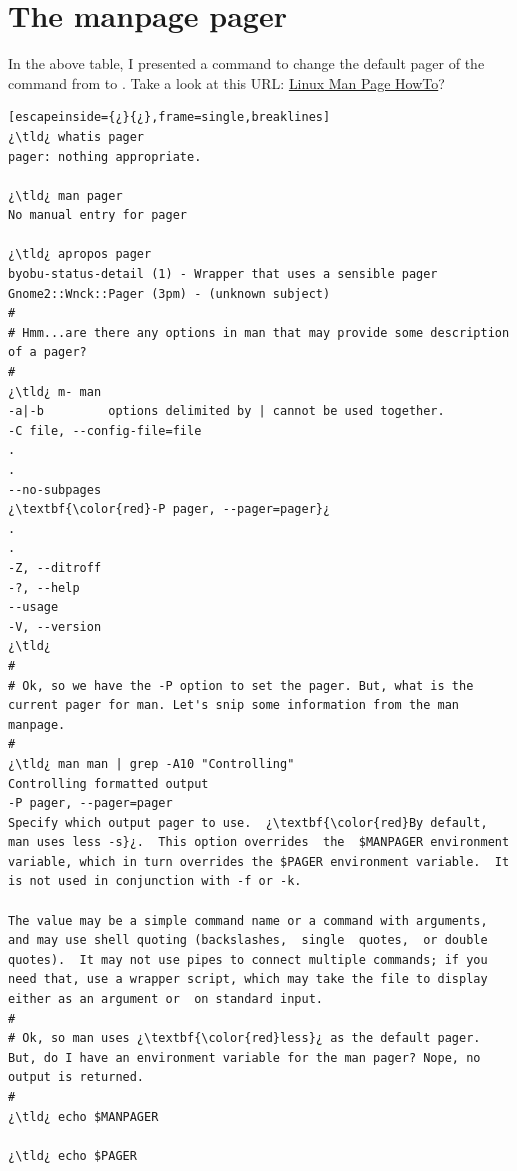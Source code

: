 \section{The manpage pager}

In the above table, I presented a command to change the default pager of the  command from  to . Take a look at this URL: \href{http://www.tldp.org/HOWTO/Man-Page/index.html}{Linux Man Page HowTo}?

\begin{lstlisting}[escapeinside={¿}{¿},frame=single,breaklines]
¿\tld¿ whatis pager
pager: nothing appropriate.

¿\tld¿ man pager
No manual entry for pager

¿\tld¿ apropos pager
byobu-status-detail (1) - Wrapper that uses a sensible pager
Gnome2::Wnck::Pager (3pm) - (unknown subject)
#
# Hmm...are there any options in man that may provide some description of a pager?
#
¿\tld¿ m- man
-a|-b		  options delimited by | cannot be used together.
-C file, --config-file=file
.
.
--no-subpages
¿\textbf{\color{red}-P pager, --pager=pager}¿
.
.
-Z, --ditroff
-?, --help
--usage
-V, --version
¿\tld¿ 
#
# Ok, so we have the -P option to set the pager. But, what is the current pager for man. Let's snip some information from the man manpage.
#
¿\tld¿ man man | grep -A10 "Controlling"
Controlling formatted output
-P pager, --pager=pager
Specify which output pager to use.  ¿\textbf{\color{red}By default, man uses less -s}¿.  This option overrides  the  $MANPAGER environment variable, which in turn overrides the $PAGER environment variable.  It is not used in conjunction with -f or -k.

The value may be a simple command name or a command with arguments, and may use shell quoting (backslashes,  single  quotes,  or double quotes).  It may not use pipes to connect multiple commands; if you need that, use a wrapper script, which may take the file to display either as an argument or  on standard input.
#
# Ok, so man uses ¿\textbf{\color{red}less}¿ as the default pager. But, do I have an environment variable for the man pager? Nope, no output is returned.
#
¿\tld¿ echo $MANPAGER

¿\tld¿ echo $PAGER


\end{lstlisting}
